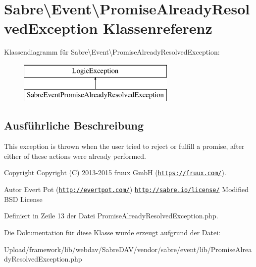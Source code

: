 \hypertarget{class_sabre_1_1_event_1_1_promise_already_resolved_exception}{}\section{Sabre\textbackslash{}Event\textbackslash{}Promise\+Already\+Resolved\+Exception Klassenreferenz}
\label{class_sabre_1_1_event_1_1_promise_already_resolved_exception}
Klassendiagramm für Sabre\textbackslash{}Event\textbackslash{}Promise\+Already\+Resolved\+Exception\+:\begin{figure}[H]
\begin{center}
\leavevmode
\includegraphics[height=2.000000cm]{class_sabre_1_1_event_1_1_promise_already_resolved_exception}
\end{center}
\end{figure}


\subsection{Ausführliche Beschreibung}
This exception is thrown when the user tried to reject or fulfill a promise, after either of these actions were already performed.

\begin{DoxyCopyright}{Copyright}
Copyright (C) 2013-\/2015 fruux GmbH (\href{https://fruux.com/}{\tt https\+://fruux.\+com/}). 
\end{DoxyCopyright}
\begin{DoxyAuthor}{Autor}
Evert Pot (\href{http://evertpot.com/}{\tt http\+://evertpot.\+com/})  \href{http://sabre.io/license/}{\tt http\+://sabre.\+io/license/} Modified B\+SD License 
\end{DoxyAuthor}


Definiert in Zeile 13 der Datei Promise\+Already\+Resolved\+Exception.\+php.



Die Dokumentation für diese Klasse wurde erzeugt aufgrund der Datei\+:\begin{DoxyCompactItemize}
\item 
Upload/framework/lib/webdav/\+Sabre\+D\+A\+V/vendor/sabre/event/lib/Promise\+Already\+Resolved\+Exception.\+php\end{DoxyCompactItemize}
